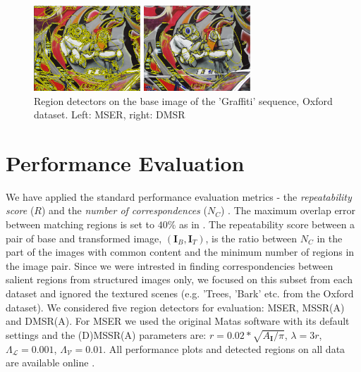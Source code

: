 \documentclass[conference,compsoc]{IEEEtran}
\def\I{{\mathbf I}}
\def\mcL{{\mathcal{L}}}
\def\mcV{{\mathcal{V}}}
\begin{document}
\begin{figure}[htb]

\begin{minipage}[b]{.49\linewidth}
  \centering
  \centerline{\includegraphics[width=4.0cm]{mserGraffiti1}}
\end{minipage}
\hfill
\begin{minipage}[b]{0.49\linewidth}
  \centering
  \centerline{\includegraphics[width=4.0cm]{dmsrGraffiti1}}
\end{minipage}
\vspace{-0.25cm}
\caption{Region detectors on the base image of the 'Graffiti' sequence, Oxford dataset. Left: MSER, right: DMSR}
\label{fig:det_graffiti}
%
\end{figure}
\section{Performance  Evaluation}
\label{sec:perf}


We have applied the standard performance evaluation metrics - the {\em repeatability score} ($R$) and the {\em number of correspondences} ($N_C$) \cite{Mikolajczyk:2005}. The maximum overlap error between matching regions is set to $40\%$ as in \cite{Mikolajczyk:2005}. The repeatability score between a pair of base and transformed image, $(\I_B,\I_T)$, is the ratio between $N_C$ in the part of the images with common content and the minimum number of regions in the image pair. Since we were intrested in finding correspondencies between salient regions from structured images only, we focused on this subset from each dataset and ignored the textured scenes (e.g. 'Trees, 'Bark' etc. from the Oxford dataset). We considered five region detectors for evaluation: MSER, MSSR(A) and DMSR(A). For MSER we used the original Matas software with its default settings and the (D)MSSR(A) parameters are: $r = 0.02*\sqrt{A_{\I} / \pi}$, $\lambda=3r$, $\Lambda_{\mcL}=0.001$, $\Lambda_{\mcV}=0.01$.
All performance plots and detected regions on all data are available online \cite{elena_ranguelova_2016_45156}.
\end{document}
